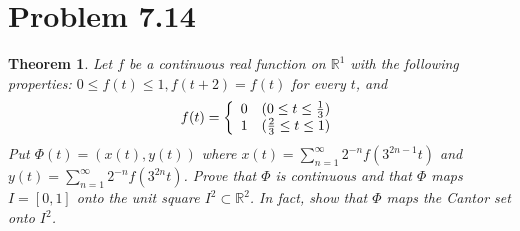 \documentclass[psamsfonts]{amsart}
\newtheorem{thm}{Theorem}[section]
\theoremstyle{definition}
\theoremstyle{remark}
\numberwithin{equation}{section}
\begin{document}
\section{Problem 7.14}

\begin{thm}
Let $f$ be a continuous real function on $\mathbb{R}^1$ with the following properties: $0 \leq f(t) \leq 1, f(t+2) = f(t)$ for every $t$, and
\begin{eqnarray}
f(t) = \left\{ \begin{array}{l l}
0 & (0 \leq t \leq \frac{1}{3}) \\
1 & (\frac{2}{3} \leq t \leq 1) \end{array} \right.
\end{eqnarray}
Put $\Phi (t) = (x(t), y(t))$ where $x(t) = \sum_{n=1}^\infty 2^{-n} f(3^{2n-1} t)$ and $y(t) = \sum_{n=1}^\infty 2^{-n} f(3^{2n} t)$. Prove that $\Phi$ is continuous and that $\Phi$ maps $I = [0,1]$ onto the unit square $I^2 \subset \mathbb{R}^2$. In fact, show that $\Phi$ maps the Cantor set onto $I^2$. 
\end{thm}
\end{document}
